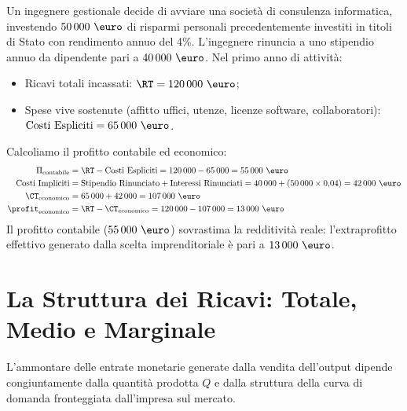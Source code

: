 \begin{esempio}
Un ingegnere gestionale decide di avviare una società di consulenza informatica, investendo $50\,000\text{ \euro}$ di risparmi personali precedentemente investiti in titoli di Stato con rendimento annuo del 4\%. L'ingegnere rinuncia a uno stipendio annuo da dipendente pari a $40\,000\text{ \euro}$. Nel primo anno di attività:
\begin{itemize}
    \item Ricavi totali incassati: $\RT = 120\,000\text{ \euro}$;
    \item Spese vive sostenute (affitto uffici, utenze, licenze software, collaboratori): $\text{Costi Espliciti} = 65\,000\text{ \euro}$.
\end{itemize}
Calcoliamo il profitto contabile ed economico:
\begin{align*}
    \Pi_{\text{contabile}} &= \RT - \text{Costi Espliciti} = 120\,000 - 65\,000 = 55\,000\text{ \euro} \\
    \text{Costi Impliciti} &= \text{Stipendio Rinunciato} + \text{Interessi Rinunciati} = 40\,000 + (50\,000 \times 0{,}04) = 42\,000\text{ \euro} \\
    \CT_{\text{economico}} &= 65\,000 + 42\,000 = 107\,000\text{ \euro} \\
    \profit_{\text{economico}} &= \RT - \CT_{\text{economico}} = 120\,000 - 107\,000 = 13\,000\text{ \euro}
\end{align*}
Il profitto contabile ($55\,000\text{ \euro}$) sovrastima la redditività reale: l'extraprofitto effettivo generato dalla scelta imprenditoriale è pari a $13\,000\text{ \euro}$.
\end{esempio}

\section{La Struttura dei Ricavi: Totale, Medio e Marginale}

L'ammontare delle entrate monetarie generate dalla vendita dell'output dipende congiuntamente dalla quantità prodotta $Q$ e dalla struttura della curva di domanda fronteggiata dall'impresa sul mercato.

